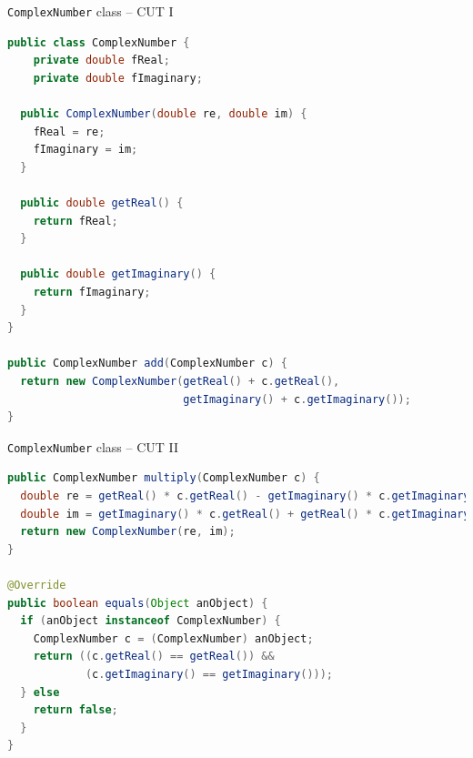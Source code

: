 \documentclass[11pt, xcolor=svgnames]{beamer}
\begin{document}


\begin{frame}[fragile]{\texttt{ComplexNumber} class -- CUT I}


\begin{lstlisting}[language=Java,basicstyle=\scriptsize]
public class ComplexNumber {
    private double fReal;
    private double fImaginary;

  public ComplexNumber(double re, double im) {
    fReal = re;
    fImaginary = im;
  }

  public double getReal() {
    return fReal;
  }

  public double getImaginary() {
    return fImaginary;
  }
}

public ComplexNumber add(ComplexNumber c) {
  return new ComplexNumber(getReal() + c.getReal(), 
                           getImaginary() + c.getImaginary());
}
\end{lstlisting}

\end{frame}


\begin{frame}[fragile]{\texttt{ComplexNumber} class -- CUT II}

\begin{lstlisting}[language=Java,basicstyle=\scriptsize]
public ComplexNumber multiply(ComplexNumber c) {
  double re = getReal() * c.getReal() - getImaginary() * c.getImaginary();
  double im = getImaginary() * c.getReal() + getReal() * c.getImaginary();
  return new ComplexNumber(re, im);
}

@Override
public boolean equals(Object anObject) {
  if (anObject instanceof ComplexNumber) {
    ComplexNumber c = (ComplexNumber) anObject;
    return ((c.getReal() == getReal()) && 
            (c.getImaginary() == getImaginary()));
  } else
    return false;
  }
}
\end{lstlisting}

\end{frame}



\end{document}

